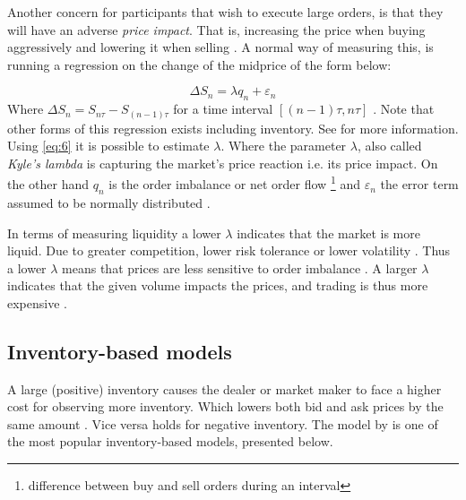 \documentclass{kththesis}
\theoremstyle{definition}
\begin{document}
Another concern for participants that wish to execute large orders, is that they will have an adverse \textit{price impact}. That is, increasing the price when buying aggressively and lowering it when selling \parencite{cartea2015algorithmic, bouchaud2018trades}. A normal way of measuring this, is running a regression on the change of the midprice of the form below:

\begin{equation}
    \label{eq:6}
    \Delta S_n = \lambda q_n + \varepsilon_n
\end{equation}
Where $\Delta S_n = S_{n\tau}-S_{(n-1)\tau}$ for a time interval $[(n-1)\tau, n\tau]$ \parencite{cartea2015algorithmic}. Note that other forms of this regression exists including inventory. See \textcite{foucault2013market} for more information. Using \autoref{eq:6} it is possible to estimate $\lambda$. Where the parameter $\lambda$, also called \textit{Kyle's lambda} \parencite{bouchaud2018trades} is capturing the market's price reaction i.e. its price impact. On the other hand $q_n$ is the order imbalance or net order flow \footnote{difference between buy and sell orders during an interval} and  $\varepsilon_n$ the error term assumed to be normally distributed \parencite{cartea2015algorithmic, foucault2013market}. 

\newpage
In terms of measuring liquidity a lower $\lambda$ indicates that the market is more liquid. Due to greater competition, lower risk tolerance or lower volatility \parencite{cartea2015algorithmic}. Thus a lower $\lambda$ means that prices are less sensitive to order imbalance \parencite{foucault2013market}.  A larger $\lambda$ indicates that the given volume impacts the prices, and trading is thus more expensive \parencite{bouchaud2018trades}.

\subsection{Inventory-based models}
A large (positive) inventory causes the dealer or market maker to face a higher cost for observing more inventory. Which lowers both bid and ask prices by the same amount \parencite{o1995market}. Vice versa holds for negative inventory. The model by \textcite{ho1981optimal} is one of the most popular inventory-based models, presented below.
\end{document}
